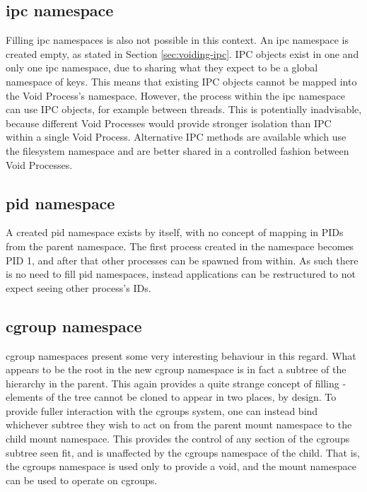 \documentclass[12pt,a4paper,twoside]{report}
\begin{document}
\subsection{ipc namespace}
\label{sec:filling-ipc}

Filling ipc namespaces is also not possible in this context. An ipc namespace is created empty, as stated in Section \ref{sec:voiding-ipc}. IPC objects exist in one and only one ipc namespace, due to sharing what they expect to be a global namespace of keys. This means that existing IPC objects cannot be mapped into the Void Process's namespace. However, the process within the ipc namespace can use IPC objects, for example between threads. This is potentially inadvisable, because different Void Processes would provide stronger isolation than IPC within a single Void Process. Alternative IPC methods are available which use the filesystem namespace and are better shared in a controlled fashion between Void Processes.

\subsection{pid namespace}
\label{sec:filling-pid}

A created pid namespace exists by itself, with no concept of mapping in PIDs from the parent namespace. The first process created in the namespace becomes PID 1, and after that other processes can be spawned from within. As such there is no need to fill pid namespaces, instead applications can be restructured to not expect seeing other process's IDs.

\subsection{cgroup namespace}
\label{sec:filling-cgroup}

cgroup namespaces present some very interesting behaviour in this regard. What appears to be the root in the new cgroup namespace is in fact a subtree of the hierarchy in the parent. This again provides a quite strange concept of filling - elements of the tree cannot be cloned to appear in two places, by design. To provide fuller interaction with the cgroups system, one can instead bind whichever subtree they wish to act on from the parent mount namespace to the child mount namespace. This provides the control of any section of the cgroups subtree seen fit, and is unaffected by the cgroups namespace of the child. That is, the cgroups namespace is used only to provide a void, and the mount namespace can be used to operate on cgroups.
\end{document}
